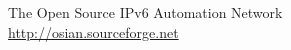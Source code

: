 \begin{thebibliography}{99}
  The Open Source IPv6 Automation Network \\
  \url{http://osian.sourceforge.net}
%
%
%
%
%
%
%
%
%
%
%

\end{thebibliography}

